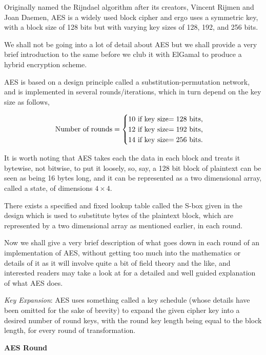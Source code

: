 Originally named the Rijndael algorithm after its creators, Vincent Rijmen and Joan Daemen, AES is a widely used block cipher and ergo uses a symmetric key, with a block size of 128 bits but with varying key sizes of 128, 192, and 256 bits.

We shall not be going into a lot of detail about AES but we shall provide a very brief introduction to the same before we club it with ElGamal to produce a hybrid encryption scheme.

AES is based on a design principle called a substitution-permutation network, and is implemented in several rounds/iterations, which in turn depend on the key size as follows,

\begin{align*}
    \text{Number of rounds}=\begin{cases}
    10 \text{ if key size$ = 128$ bits,}\\
    12 \text{ if key size$ = 192$ bits,}\\
    14 \text{ if key size$ = 256$ bits.}
    \end{cases}
\end{align*}

It is worth noting that AES takes each the data in each block and treats it bytewise, not bitwise, to put it loosely, so, say, a 128 bit block of plaintext can be seen as being 16 bytes long, and it can be represented as a two dimensional array, called a state, of dimensions $4\times4$.

There exists a specified and fixed lookup table called the S-box given in the design which is used to substitute bytes of the plaintext block, which are represented by a two dimensional array as mentioned earlier, in each round.

Now we shall give a very brief description of what goes down in each round of an implementation of AES, without getting too much into the mathematics or details of it as it will involve quite a bit of field theory and the like, and interested readers may take a look at \cite{daemen1999aes} for a detailed and well guided explanation of what AES does.

\emph{Key Expansion}: AES uses something called a key schedule (whose details have been omitted for the sake of brevity) to expand the given cipher key into a desired number of round keys, with the round key length being equal to the block length, for every round of transformation.

\begin{center}
    \textbf{AES Round}
\end{center}

